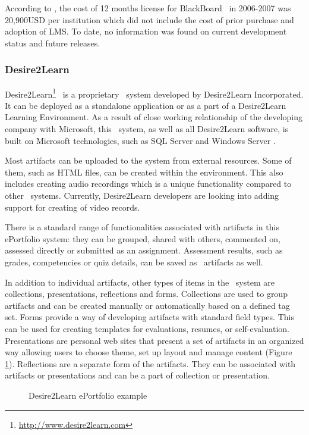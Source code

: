 According to \citet{Sweat-Guy2007}, the cost of 12 months license for
BlackBoard \ep~in 2006-2007 was 20,900USD per institution which did not include
the cost of prior purchase and adoption of LMS. To date, no information was
found on current development status and future releases.

\subsubsection{Desire2Learn}
Desire2Learn\footnote{\url{http://www.desire2learn.com}} \ep~is a proprietary
\ep~system developed by Desire2Learn Incorporated. It can be deployed as a
standalone application or as a part of a Desire2Learn Learning Environment. As a
result of close working relationship of the developing company with Microsoft,
this \ep~system, as well as all Desire2Learn software, is built on Microsoft
technologies, such as SQL Server and Windows Server \citep{AAEEBL2011a}.

Most artifacts can be uploaded to the system from external resources. Some of
them, such as HTML files, can be created within the environment. This also
includes creating audio recordings which is a unique functionality compared to
other \ep~systems. Currently, Desire2Learn developers are looking into adding
support for creating of video records.

There is a standard range of functionalities associated with artifacts in this
ePortfolio system: they can be grouped, shared with others, commented on,
assessed directly or submitted as an assignment. Assessment results, such as
grades, competencies or quiz details, can be saved as \ep~artifacts as well.

In addition to individual artifacts, other types of items in the \ep~system are
collections, presentations, reflections and forms. Collections are used to group
artifacts and can be created manually or automatically based on a defined tag
set. Forms provide a way of developing artifacts with standard field types. This
can be used for creating templates for evaluations, resumes, or self-evaluation.
Presentations are personal web sites that present a set of artifacts in an
organized way allowing users to choose theme, set up layout and manage content
(Figure \ref{fig:d2ep}). Reflections are a separate form of the artifacts. They
can be associated with artifacts or presentations and can be a part of
collection or presentation.

\begin{figure}[htb]
\centering
\setlength\fboxsep{0pt}
\setlength\fboxrule{0.5pt}
\fbox{\texttt{[image: CH4-F7-D2L]}}
\caption[Desire2Learn ePortfolio example]{Desire2Learn ePortfolio example
\citep{Desire2LearnIncorporated2011}}
\label{fig:d2ep} 
\end{figure}

